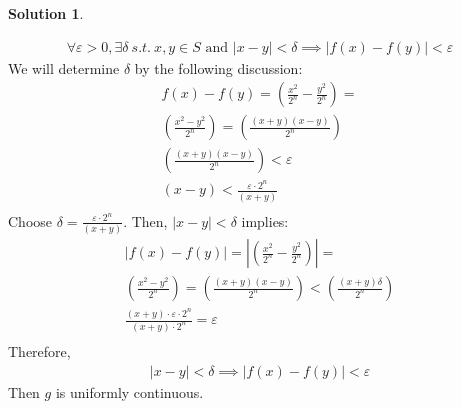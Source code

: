 \documentclass[12pt]{article}
\theoremstyle{definition} %
\newtheorem{solution}{Solution}
\theoremstyle{plain} %
\begin{document}
\begin{solution}
\begin{enumerate}
            \begin{align}
                \forall \varepsilon>0, \exists \delta \ s.t. \ x,y\in S \text{ and } \left\vert x-y \right\vert <\delta \implies \left\vert f(x)-f(y) \right\vert <\varepsilon
            \end{align} 
            We will determine $\delta$ by the following discussion:
            \begin{align}
                f(x)-f(y) = \left(\frac{x^{2}}{2^{n}}- \frac{y^{2}}{2^{n}}   \right) =\\[10pt] 
                \left( \frac{x^{2}-y^{2}}{2^{n}} \right) = \left( \frac{(x+y)(x-y)}{2^{n}} \right)  \\[10pt] 
                \left( \frac{(x+y)(x-y)}{2^{n}} \right) <\varepsilon \\[10pt] 
                (x-y) < \frac{\varepsilon \cdot 2^{n}}{(x+y)} \\[10pt] 
            \end{align} 
            Choose $\delta=\frac{\varepsilon \cdot 2^{n}}{(x+y)}$. Then, $\left\vert x-y \right\vert <\delta $ implies:
            \begin{align}
                \left\vert f(x)-f(y) \right\vert = \left\vert \left(\frac{x^{2}}{2^{n}}- \frac{y^{2}}{2^{n}}   \right) \right\vert  =\\[10pt] 
                \left( \frac{x^{2}-y^{2}}{2^{n}} \right) = \left( \frac{(x+y)(x-y)}{2^{n}} \right) < \left( \frac{(x+y)\delta}{2^{n}} \right) \\[10pt] 
                \frac{(x+y)\cdot \varepsilon \cdot 2^{n}}{(x+y)\cdot 2^{n}} = \varepsilon \\[10pt]  
            \end{align} 
            Therefore, 
            \begin{align}
                \left\vert x-y \right\vert < \delta \implies  \left\vert f(x)-f(y) \right\vert < \varepsilon
            \end{align}
            Then $g$ is uniformly continuous.
        \end{enumerate}
        

\end{solution}
\end{document}
